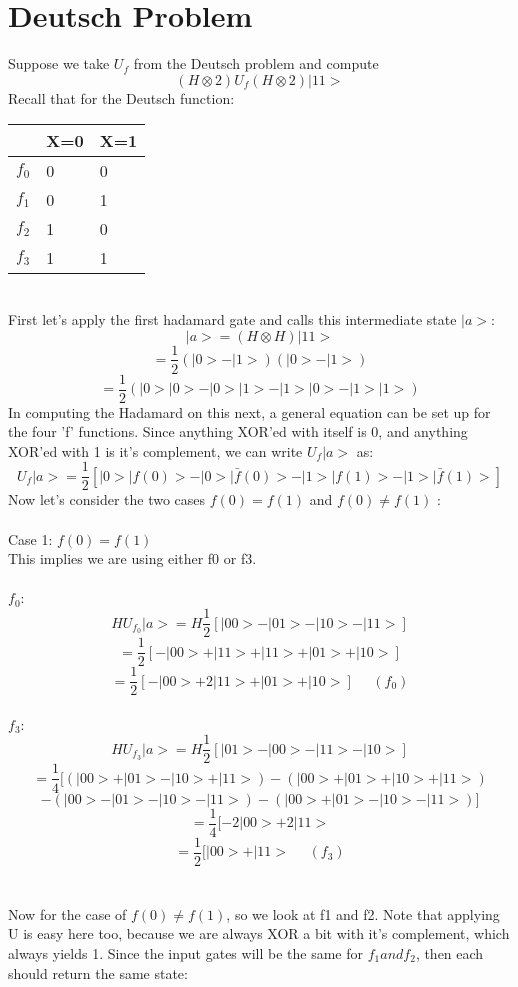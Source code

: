 \documentclass[12pt]{article}
\begin{document}
\section{Deutsch Problem}

Suppose we take $U_{f}$ from the Deutsch problem and compute
$$(H\otimes 2)U_{f} (H\otimes 2)|11>$$
Recall that for the Deutsch function:
\\
\begin{table}[h]
\centering
    \begin{tabular}{|l|l|l|}
        \hline
        ~  & X=0 & X=1 \\ \hline
        $f_{0}$ & 0   & 0   \\ \hline
        $f_{1}$ & 0   & 1   \\  \hline
        $f_{2}$ & 1   & 0   \\ \hline
        $f_{3}$ & 1   & 1   \\
        \hline
    \end{tabular}
\end{table}
\\
First let's apply the first hadamard gate and calls this intermediate state $|a>$:
$$|a> = (H\otimes H)|11>$$
$$= \frac{1}{2} (|0> - |1>)(|0> - |1>)$$
$$=\frac{1}{2}(|0>|0> - |0>|1> - |1>|0> - |1>|1>)$$
In computing the Hadamard on this next, a general equation can be set up for the four 'f' functions. Since anything XOR'ed with itself is 0, and anything XOR'ed with 1 is it's complement, we can write $U_{f}|a>$ as:
$$U_{f}|a> = \frac{1}{2}[|0>|f(0)> - |0>|\bar{f}(0)> - |1>|f(1)> - |1>|\bar{f}(1)>] $$
Now let's consider the two cases $f(0)=f(1)$ and $f(0) \neq f(1)$ :
\\\\ Case 1: $f(0)=f(1)$
\\This implies we are using either f0 or f3.
\\\\$f_{0}$:
$$ HU_{f_{0}}|a> = H \frac{1}{2}[|00> - |01> - |10> - |11>]$$
$$  = \frac{1}{2}[-|00> + |11> + |11> + |01> + |10>]$$
\[
\boxed{ = \frac{1}{2}[-|00> + 2|11> + |01> + |10>] \>\>\>\>\>\>(f_{0}) }
\] 
\\$f_{3}$:
$$ HU_{f_{3}}|a> = H  \frac{1}{2}[|01> - |00> - |11> - |10>]$$
$$ = \frac{1}{4}[ (|00> + |01> - |10> + |11>) -  (|00> + |01> + |10> + |11>)$$$$- (|00> - |01> - |10> - |11>) - (|00> + |01> - |10> - |11>)]$$
$$ = \frac{1}{4}[-2|00> + 2|11>$$
\[
\boxed{ = \frac{1}{2}[|00> + |11> 	\>\>\>\>\>\>(f_{3})}
\]
\\\\
Now for the case of $f(0) \neq f(1)$, so we look at f1 and f2. Note that applying U is easy here too, because we are always XOR a bit with it's complement, which always yields 1. Since the input gates will be the same for $f_{1} and f_{2}$, then each should return the same state:
\end{document}
